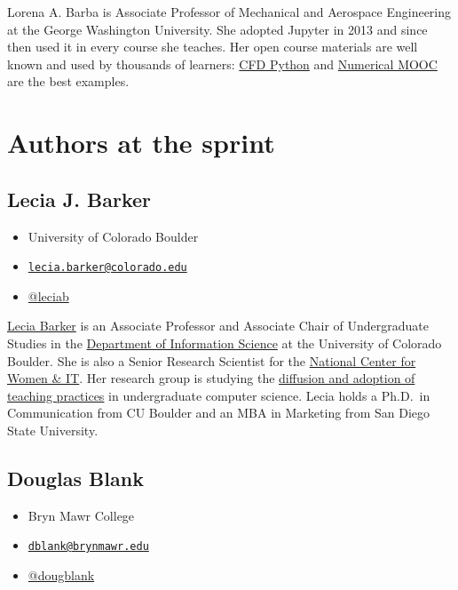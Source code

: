 \documentclass[]{book}
\providecommand{\tightlist}{%
  \setlength{\itemsep}{0pt}\setlength{\parskip}{0pt}}
\begin{document}
Lorena A. Barba is Associate Professor of Mechanical and Aerospace
Engineering at the George Washington University. She adopted Jupyter in
2013 and since then used it in every course she teaches. Her open course
materials are well known and used by thousands of learners:
\href{http://lorenabarba.com/blog/cfd-python-12-steps-to-navier-stokes/}{CFD
Python} and
\href{https://github.com/numerical-mooc/numerical-mooc}{Numerical MOOC}
are the best examples.

\section{Authors at the sprint}\label{authors-at-the-sprint}

\subsection*{Lecia J. Barker}\label{lecia-j.-barker}

\begin{itemize}
\tightlist
\item
  University of Colorado Boulder
\item
  \href{mailto:lecia.barker@colorado.edu}{\nolinkurl{lecia.barker@colorado.edu}}
\item
  \href{https://twitter.com/leciab}{@leciab}
\end{itemize}

\href{https://www.colorado.edu/cmci/people/information-science/lecia-barker}{Lecia
Barker} is an Associate Professor and Associate Chair of Undergraduate
Studies in the
\href{https://www.colorado.edu/cmci/infoscience}{Department of
Information Science} at the University of Colorado Boulder. She is also
a Senior Research Scientist for the
\href{https://www.ncwit.org/}{National Center for Women \& IT}. Her
research group is studying the
\href{https://csteachingpractices.wordpress.com/}{diffusion and adoption
of teaching practices} in undergraduate computer science. Lecia holds a
Ph.D.~in Communication from CU Boulder and an MBA in Marketing from San
Diego State University.

\subsection*{Douglas Blank}\label{douglas-blank}

\begin{itemize}
\tightlist
\item
  Bryn Mawr College
\item
  \href{mailto:dblank@brynmawr.edu}{\nolinkurl{dblank@brynmawr.edu}}
\item
  \href{https://twitter.com/dougblank}{@dougblank}
\end{itemize}
\end{document}
